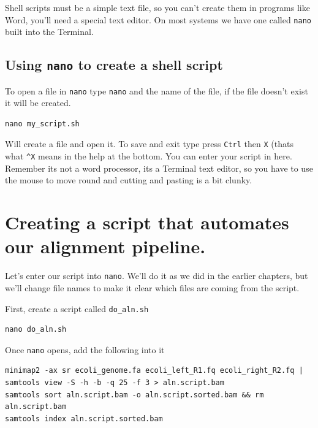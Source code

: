\documentclass[]{book}
\begin{document}
Shell scripts must be a simple text file, so you can't create them in programs like Word, you'll need a special text editor. On most systems we have one called \texttt{nano} built into the Terminal.

\hypertarget{using-nano-to-create-a-shell-script}{%
\subsection{\texorpdfstring{Using \texttt{nano} to create a shell script}{Using nano to create a shell script}}\label{using-nano-to-create-a-shell-script}}

To open a file in \texttt{nano} type \texttt{nano} and the name of the file, if the file doesn't exist it will be created.

\begin{verbatim}
nano my_script.sh
\end{verbatim}

Will create a file and open it. To save and exit type press \texttt{Ctrl} then \texttt{X} (thats what \texttt{\^{}X} means in the help at the bottom. You can enter your script in here. Remember its not a word processor, its a Terminal text editor, so you have to use the mouse to move round and cutting and pasting is a bit clunky.

\hypertarget{creating-a-script-that-automates-our-alignment-pipeline.}{%
\section{Creating a script that automates our alignment pipeline.}\label{creating-a-script-that-automates-our-alignment-pipeline.}}

Let's enter our script into \texttt{nano}. We'll do it as we did in the earlier chapters, but we'll change file names to make it clear which files are coming from the script.

First, create a script called \texttt{do\_aln.sh}

\begin{verbatim}
nano do_aln.sh
\end{verbatim}

Once \texttt{nano} opens, add the following into it

\begin{verbatim}
minimap2 -ax sr ecoli_genome.fa ecoli_left_R1.fq ecoli_right_R2.fq | samtools view -S -h -b -q 25 -f 3 > aln.script.bam
samtools sort aln.script.bam -o aln.script.sorted.bam && rm aln.script.bam
samtools index aln.script.sorted.bam
\end{verbatim}
\end{document}
